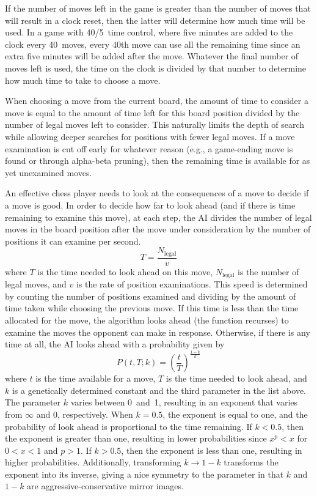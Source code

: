 \documentclass[letterpaper]{article}
\renewcommand\_{\textunderscore\allowbreak}
\begin{document}
If the number of moves left in the game is greater than the number of moves that will result in a clock reset, then the latter will determine how much time will be used. In a game with 40/5~time control, where five minutes are added to the clock every 40~moves, every 40th move can use all the remaining time since an extra five minutes will be added after the move. Whatever the final number of moves left is used, the time on the clock is divided by that number to determine how much time to take to choose a move.

When choosing a move from the current board, the amount of time to consider a move is equal to the amount of time left for this board position divided by the number of legal moves left to consider. This naturally limits the depth of search while allowing deeper searches for positions with fewer legal moves. If a move examination is cut off early for whatever reason (e.g., a game-ending move is found or through alpha-beta pruning), then the remaining time is available for as yet unexamined moves.

An effective chess player needs to look at the consequences of a move to decide if a move is good. In order to decide how far to look ahead (and if there is time remaining to examine this move), at each step, the AI divides the number of legal moves in the board position after the move under consideration by the number of positions it can examine per second.
\[
T = \frac{N_{\textrm{legal}}}{v}
\]
where \(T\) is the time needed to look ahead on this move, \(N_{\textrm{legal}}\) is the number of legal moves, and \(v\) is the rate of position examinations. This speed is determined by counting the number of positions examined and dividing by the amount of time taken while choosing the previous move. If this time is less than the time allocated for the move, the algorithm looks ahead (the function recurses) to examine the moves the opponent can make in response. Otherwise, if there is any time at all, the AI looks ahead with a probability given by
\[P(t, T; k) = \left(\frac{t}{T}\right)^\frac{1-k}{k}\]
where \(t\) is the time available for a move, \(T\) is the time needed to look ahead, and \(k\) is a genetically determined constant and the third parameter in the list above. The parameter \(k\) varies between 0~and~1, resulting in an exponent that varies from \(\infty\) and \(0\), respectively. When \(k=0.5\), the exponent is equal to one, and the probability of look ahead is proportional to the time remaining. If \(k < 0.5\), then the exponent is greater than one, resulting in lower probabilities since \(x^p < x\) for \(0 < x < 1\) and \(p > 1\).  If \(k > 0.5\), then the exponent is less than one, resulting in higher probabilities. Additionally, transforming \(k \to 1-k\) transforms the exponent into its inverse, giving a nice symmetry to the parameter in that \(k\) and \(1-k\) are aggressive-conservative mirror images.
\end{document}

